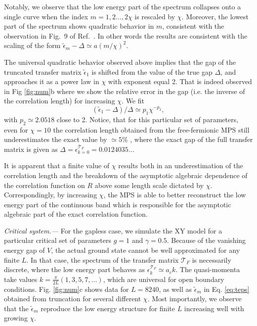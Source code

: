 \documentclass[prl,twocolumn,showpacs,floatfix,superscriptaddress,nofootinbib]{revtex4-1}
\begin{document}
Notably, we observe that the low energy part of the spectrum collapses onto a single curve when the index $m=1,2 \ldots, 2 \chi$ is rescaled by $\chi$.
Moreover, the lowest part of the spectrum shows quadratic behavior in $m$, consistent with the observation in Fig.~9 of Ref.~. In other words the results are consistent with the scaling of the form $\tilde \epsilon_m -\Delta \simeq a (m/\chi)^2$.

The universal quadratic behavior observed above implies that the gap of the truncated transfer matrix $\tilde \epsilon_1$ is shifted from the value of the true gap $\Delta$, and approaches it as a power law in $\chi$ with exponent equal 2. 
That is indeed observed in Fig \ref{fig:num}b where we show the relative error in the gap (i.e. the inverse of the correlation length) for increasing $\chi$. We fit
$$
(\tilde \epsilon_1-\Delta)/\Delta \simeq p_1 \chi^{-p_2},
$$ 
with $p_2 \simeq 2.0518$ close to 2.  Notice, that for this particular set of parameters, even for $\chi=10$ the correlation length obtained from the free-fermionic MPS still underestimates the exact value by $\simeq 5 \%$ \cite{Appendix}, where the exact gap of the full transfer matrix is given as $\Delta = \epsilon_{k=0}^{\mathcal{T}_F}  = 0.0124035 \dotsc$
 
It is apparent that a finite value of $\chi$ results both in an underestimation of the correlation length and the breakdown of the asymptotic algebraic dependence of the correlation function on $R$ above some length scale dictated by $\chi$. 
Correspondingly, by increasing $\chi$, the MPS is able to better reconstruct the low energy part of the continuous band which is responsible for the asymptotic algebraic part of the exact correlation function.



{\it Critical system.--- } 
For the gapless case, we simulate the XY model for a particular critical set of parameters $g=1$ and $\gamma=0.5$. 
Because of the vanishing energy gap of $V$, the actual ground state cannot be well approximated for any finite $L$. 
In that case, the spectrum of the transfer matrix $\mathcal{T}_F$ is necessarily discrete, where the low energy part behaves as $\epsilon_k^{\mathcal{T}_F} \simeq a_c k$. 
The quasi-momenta take values $k=\frac{\pi}{2L} (1,3,5,7,\dotsc)$, which are universal for open boundary conditions. Fig. \ref{fig:num}c shows data for $L=8240$, as well as $\tilde \epsilon_m$ in Eq. \eqref{eq:teps} obtained from truncation for several different $\chi$.  
Most importantly, we observe that the $\tilde \epsilon_m$ reproduce the low energy structure for  finite $L$ increasing well with growing $\chi$.
\end{document}

